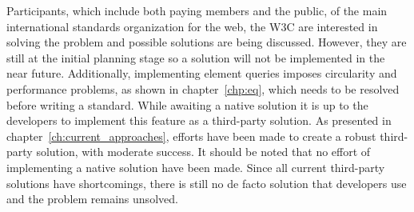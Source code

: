 \documentclass[a4paper,11pt]{kth-mag}
\begin{document}
      Participants, which include both paying members and the public, of the main international standards organization for the \gls{web}, the \gls{W3C} are interested in solving the problem and possible solutions are being discussed.
      However, they are still at the initial planning stage \cite{ricg_site} so a solution will not be implemented  in the near future.
      Additionally, implementing element queries imposes circularity and performance problems, as shown in chapter~\ref{chp:eq}, which needs to be resolved before writing a standard.
      While awaiting a \gls{native} solution it is up to the developers to implement this feature as a \gls{third-party} solution.
      As presented in chapter~\ref{ch:current_approaches}, efforts have been made to create a robust \gls{third-party} solution, with moderate success.
      It should be noted that no effort of implementing a native solution have been made.
      Since all current \gls{third-party} solutions have shortcomings, there is still no de facto solution that developers use and the problem remains unsolved.
\end{document}
